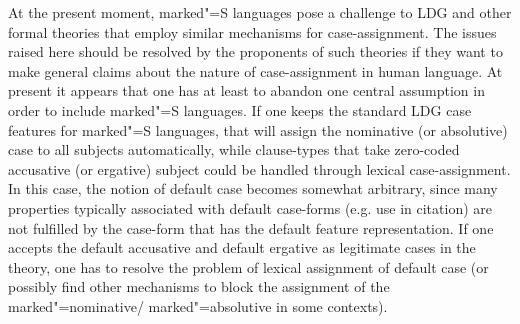 At the present moment, marked"=S languages pose a challenge to LDG and other formal theories that employ similar mechanisms for case-assignment.
The issues raised here should be resolved by the proponents of such theories if they want to make general claims about the nature of case-assignment in human language. 
At present it appears that one has at least to abandon one central assumption in order to include marked"=S languages.
If one keeps the standard LDG case features for marked"=S languages, that will assign the nominative (or absolutive) case to all subjects automatically, while clause-types that take zero-coded accusative (or ergative) subject could be handled through lexical case-assignment.
In this case, the notion of default case becomes somewhat arbitrary, since many properties typically associated with default case-forms (e.g. use in citation) are not fulfilled by the case-form that has the default feature representation. 
If one accepts the default accusative and default ergative as legitimate cases in the theory, one has to resolve the problem of lexical assignment of default case (or possibly find other mechanisms to block the assignment of the marked"=nominative/ marked"=absolutive in some contexts).

